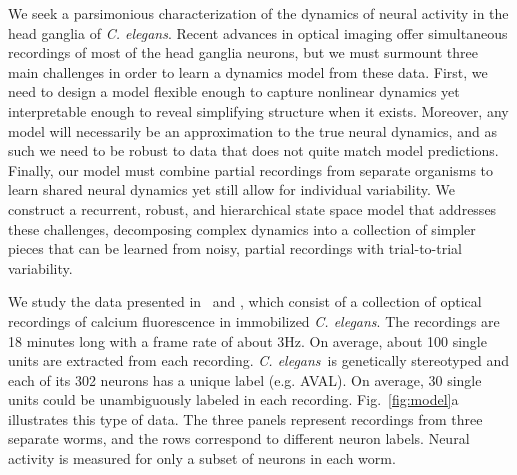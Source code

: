 \documentclass[11pt]{article}
\newcommand{\celegans}{\textit{C. elegans}}
\begin{document}
We seek a parsimonious characterization of the dynamics of neural
activity in the head ganglia of \celegans. Recent advances in optical
imaging offer simultaneous recordings of most of the head ganglia
neurons, but we must surmount three main challenges in order to learn
a dynamics model from these data.  First, we need to design a model
flexible enough to capture nonlinear dynamics yet interpretable enough
to reveal simplifying structure when it exists.  Moreover, any model
will necessarily be an approximation to the true neural dynamics, and
as such we need to be robust to data that does not quite match model
predictions.  Finally, our model must combine partial recordings from
separate organisms to learn shared neural dynamics yet still allow for
individual variability. We construct a recurrent, robust, and
hierarchical state space model that addresses these challenges,
decomposing complex dynamics into a collection of simpler pieces that
can be learned from noisy, partial recordings with trial-to-trial
variability.

We study the data presented in~\citet{kato2015global} and
\citet{nichols2017global}, which consist of a collection of optical
recordings of calcium fluorescence in immobilized \celegans. The
recordings are 18 minutes long with a frame rate of about 3Hz.  On
average, about 100 single units are extracted from each
recording. \celegans~is genetically stereotyped and each of its 302
neurons has a unique label (e.g. \textsf{AVAL}). On average, 30 single
units could be unambiguously labeled in each
recording. Fig.~\ref{fig:model}a illustrates this type of data. The
three panels represent recordings from three separate worms, and the
rows correspond to different neuron labels.  Neural activity is
measured for only a subset of neurons in each worm.
\end{document}
